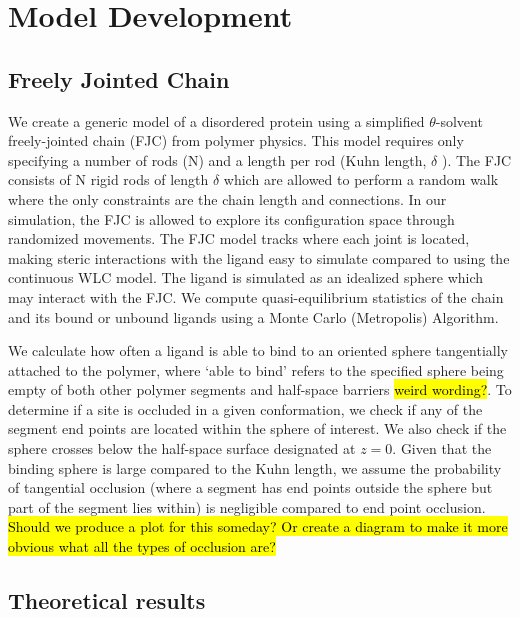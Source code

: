 \documentclass[../AdvancementSummary.tex]{subfiles}
\begin{document}
\section{Model Development}
\label{sec:ModelDev}

\subsection{Freely Jointed Chain}

We create a generic model of a disordered protein using a simplified $\theta$-solvent freely-jointed chain (FJC) from polymer physics. This model requires only specifying a number of rods (N) and a length per rod (Kuhn length, $\delta$ ).  The FJC consists of N rigid rods of length $\delta$ which are allowed to perform a random walk where the only constraints are the chain length and connections. In our simulation, the FJC is allowed to explore its configuration space through randomized movements.  The FJC model tracks where each joint is located, making steric interactions with the ligand easy to simulate compared to using the continuous WLC model.  The ligand is simulated as an idealized sphere which may interact with the FJC. We compute quasi-equilibrium statistics of the chain and its bound or unbound ligands using a Monte Carlo (Metropolis) Algorithm. 

We calculate how often a ligand is able to bind to an oriented sphere tangentially attached to the polymer, where `able to bind' refers to the specified sphere being empty of both other polymer segments and half-space barriers \hl{weird wording?}. To determine if a site is occluded in a given conformation, we check if any of the segment end points are located within the sphere of interest. We also check if the sphere crosses below the half-space surface designated at $z=0$. Given that the binding sphere is large compared to the Kuhn length, we assume the probability of tangential occlusion (where a segment has end points outside the sphere but part of the segment lies within) is negligible compared to end point occlusion. \hl{Should we produce a plot for this someday? Or create a diagram to make it more obvious what all the types of occlusion are?}

\subsection{Theoretical results}
\end{document}
